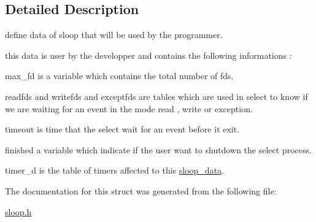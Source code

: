 \subsection{\-Detailed \-Description}
define data of sloop that will be used by the programmer. 

this data is user by the developper and contains the following informations \-:
\begin{DoxyItemize}
\item max\-\_\-fd is a variable which contains the total number of fds.
\item readfds and writefds and exceptfds are tables which are used in select to know if we are waiting for an event in the mode read , write or exception.
\item timeout is time that the select wait for an event before it exit.
\item finished a variable which indicate if the user want to shutdown the select process.
\item timer\-\_\-d is the table of timers affected to this \hyperlink{structsloop__data}{sloop\-\_\-data}. 
\end{DoxyItemize}

\-The documentation for this struct was generated from the following file\-:\begin{DoxyCompactItemize}
\item 
\hyperlink{sloop_8h}{sloop.\-h}\end{DoxyCompactItemize}
